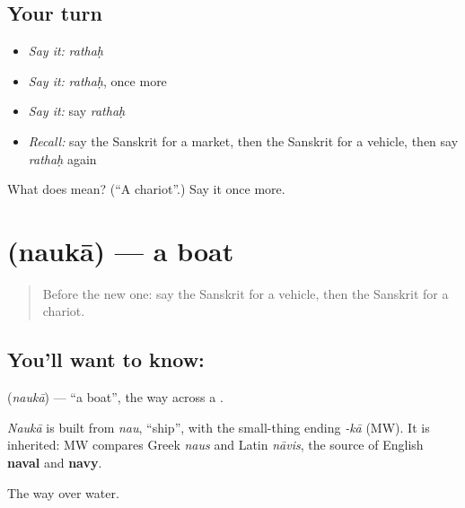 \subsection*{Your turn}
\begin{itemize}
\raggedright
  \item \emph{Say it:} \emph{rathaḥ}
  \item \emph{Say it:} \emph{rathaḥ}, once more
  \item \emph{Say it:} say \emph{rathaḥ}
  \item \emph{Recall:} say the Sanskrit for a market, then the Sanskrit for a vehicle, then say \emph{rathaḥ} again
\end{itemize}

\begin{tcolorbox}[breakable,colback=teal!4,colframe=teal!35!black,title={Before you move on}]
What does  mean? (\textquotedblleft{}A chariot\textquotedblright{}.) Say it once more.
\end{tcolorbox}
\section[\texorpdfstring{\sk{नौका} (naukā)}{नौका (naukā)}]{ (naukā) — a boat}

\label{lesson:SA-C75-boat}



\begin{quote}
Before the new one: say the Sanskrit for a vehicle, then the Sanskrit for a chariot.
\end{quote}

\subsection*{You'll want to know: }
\textbf{} (\emph{naukā}) — \textquotedblleft{}a boat\textquotedblright{}, the way across a \textbf{}.

\begin{cousinweb}
\emph{Naukā} is built from \emph{nau}, \textquotedblleft{}ship\textquotedblright{}, with the small-thing ending \emph{-kā} (MW). It is inherited: MW compares Greek \emph{naus} and Latin \emph{nāvis}, the source of English \textbf{naval} and \textbf{navy}.
\end{cousinweb}

\begin{grammarlens}[title={What you've built}]
The way over water.
\end{grammarlens}

